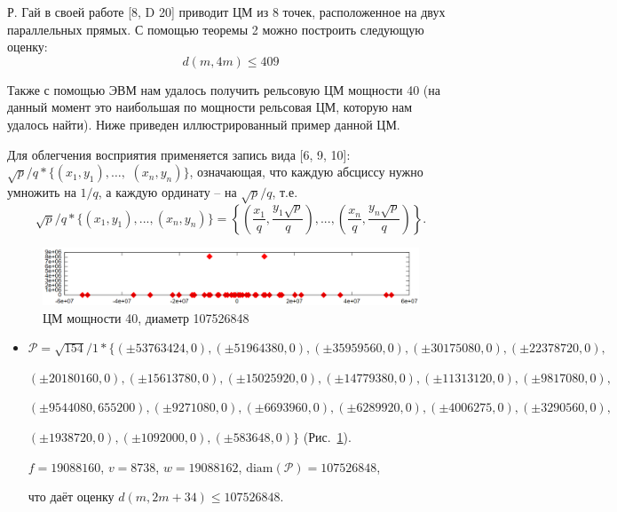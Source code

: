 \documentclass[12pt]{article}
\theoremstyle{theorem}
\theoremstyle{dfn}
\theoremstyle{remark}
\begin{document}
Р. Гай в своей работе [8, D 20] приводит ЦМ из $8$ точек, расположенное на двух параллельных прямых. С помощью теоремы 2 можно построить следующую оценку:
\begin{equation}\label{result1}
d(m, 4m) \leq 409
\end{equation}

Также с помощью ЭВМ нам удалось получить рельсовую ЦМ мощности 40 (на данный момент это наибольшая по мощности рельсовая ЦМ, которую нам удалось найти).
Ниже приведен иллюстрированный пример данной ЦМ.

Для облегчения восприятия применяется запись вида
[6, 9, 10]:
$\sqrt{p}/q * \{ (x_1,y_1), \ldots,$ $ (x_n, y_n)  \}$,
означающая, что каждую абсциссу нужно умножить на $1/q$,
а каждую ординату -- на $\sqrt{p}/q$, т.е.
$$
	\sqrt{p}/q * \{ (x_1,y_1), ..., (x_n, y_n)  \}
	=
	\left\{ \left(\frac{x_1}{q},\frac{y_1\sqrt{p}}{q}\right), ..., \left(\frac{x_n}{q},   \frac{y_n\sqrt{p}}{q}\right)  \right\}.
$$

\begin{figure}[h!]
	\begin{center}
	\includegraphics[width=1.1\linewidth]{picture_40.png}
	\parbox{1\linewidth}{\caption{ЦМ мощности 40, диаметр 107526848}
	\label{picture_40.png}}
	\end{center}
\end{figure}

\begin{itemize}
\setlength{\itemsep}{-1mm}

\item
$\mathcal{P}=\sqrt{154}/{1} * \{ (\pm 53763424, 0),
(\pm 51964380 , 0),
(\pm 35959560 , 0),
(\pm 30175080 , 0),
(\pm 22378720 , 0),
$

$
(\pm 20180160 , 0),
(\pm 15613780 , 0),
(\pm 15025920 , 0),
(\pm 14779380 , 0),
(\pm 11313120 , 0),
(\pm 9817080 , 0),
$

$
(\pm 9544080 , 655200),
(\pm 9271080 , 0),
(\pm 6693960 , 0),
(\pm 6289920 , 0),
(\pm 4006275 , 0),
(\pm 3290560 , 0),
$

$
(\pm 1938720 , 0),
(\pm 1092000 , 0),
(\pm 583648 , 0)\}
$
(Рис.~\ref{picture_40.png}).

$f = 19088160$, $v = 8738$, $w = 19088162$, $\operatorname{diam(\mathcal{P})}
= 107526848$,

что даёт оценку $d(m, 2m + 34) \leq 107526848$.

\end{itemize}
\end{document}
